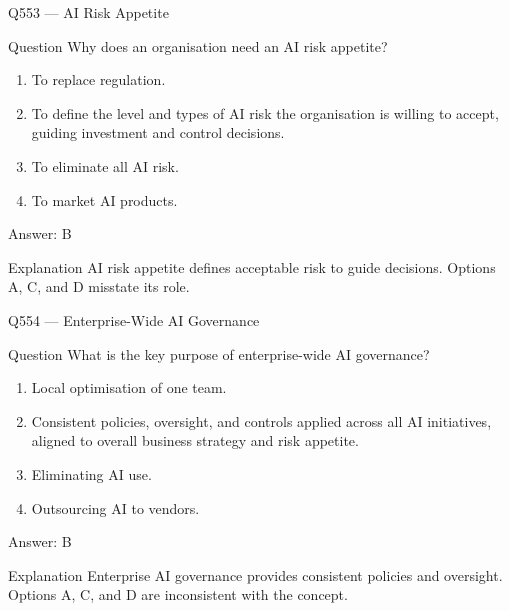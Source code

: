 \documentclass[aspectratio=169,8pt]{beamer}
\begin{document}
	\begin{frame}{Q553 --- AI Risk Appetite}
		\begin{block}{Question}
			Why does an organisation need an AI risk appetite?
			\begin{enumerate}
				\item To replace regulation.
				\item To define the level and types of AI risk the organisation is willing to accept, guiding investment and control decisions.
				\item To eliminate all AI risk.
				\item To market AI products.
			\end{enumerate}
		\end{block}
		\begin{exampleblock}{Answer: B}\end{exampleblock}
		\begin{block}{Explanation}
			AI risk appetite defines acceptable risk to guide decisions. Options A, C, and D misstate its role.
		\end{block}
	\end{frame}
	
	\begin{frame}{Q554 --- Enterprise-Wide AI Governance}
		\begin{block}{Question}
			What is the key purpose of enterprise-wide AI governance?
			\begin{enumerate}
				\item Local optimisation of one team.
				\item Consistent policies, oversight, and controls applied across all AI initiatives, aligned to overall business strategy and risk appetite.
				\item Eliminating AI use.
				\item Outsourcing AI to vendors.
			\end{enumerate}
		\end{block}
		\begin{exampleblock}{Answer: B}\end{exampleblock}
		\begin{block}{Explanation}
			Enterprise AI governance provides consistent policies and oversight. Options A, C, and D are inconsistent with the concept.
		\end{block}
	\end{frame}
	
\end{document}
